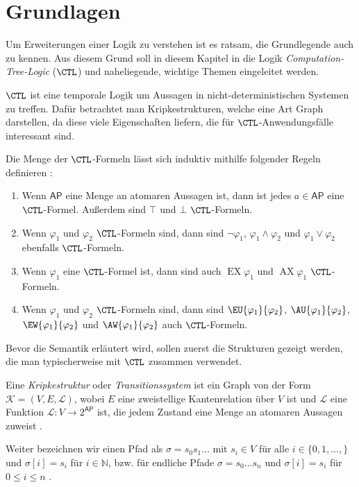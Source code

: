 \section{Grundlagen}
\label{ChapGrundlagen}

Um Erweiterungen einer Logik zu verstehen ist es ratsam, die Grundlegende auch zu kennen. Aus diesem Grund soll in diesem Kapitel in die Logik \textit{Computation-Tree-Logic} ($\CTL$) und naheliegende, wichtige Themen eingeleitet werden.

$\CTL$ ist eine temporale Logik um Aussagen in nicht-deterministischen Systemen zu treffen. 
Dafür betrachtet man Kripkestrukturen, welche eine Art Graph darstellen, da diese viele Eigenschaften liefern, die für $\CTL$-Anwendungsfälle interessant sind.

\begin{definition}
	Die Menge der $\CTL$-Formeln lässt sich induktiv mithilfe folgender Regeln definieren \cite{clarke1982design, baier2008principles}:
	\begin{enumerate}
		\item Wenn $\mathsf{AP}$ eine Menge an atomaren Aussagen ist, dann ist jedes $a\in \mathsf{AP}$ eine $\CTL$-Formel. Außerdem sind $\top$ und $\bot$ $\CTL$-Formeln.
		\item Wenn $\varphi_1$ und $\varphi_2$ $\CTL$-Formeln sind, dann sind $\neg\varphi_1$, $\varphi_1 \land \varphi_2$ und $\varphi_1 \lor \varphi_2$ ebenfalls $\CTL$-Formeln.
		\item Wenn $\varphi_1$ eine $\CTL$-Formel ist, dann sind auch $\operatorname{EX}\varphi_1$ und $\operatorname{AX}\varphi_1$ $\CTL$-Formeln.
		\item Wenn $\varphi_1$ und $\varphi_2$ $\CTL$-Formeln sind, dann sind $\EU{\varphi_1}{\varphi_2}$, $\AU{\varphi_1}{\varphi_2}$, $\EW{\varphi_1}{\varphi_2}$ und $\AW{\varphi_1}{\varphi_2}$ auch $\CTL$-Formeln.
	\end{enumerate}
\end{definition}

Bevor die Semantik erläutert wird, sollen zuerst die Strukturen gezeigt werden, die man typischerweise mit $\CTL$ zusammen verwendet.

\begin{definition}[Kripkestrukturen]
	\label{DefKripkeStruk}
	Eine \textit{Kripkestruktur} oder \textit{Transitionssystem} ist ein Graph von der Form $\mathcal{K}=(V, E, \mathcal{L})$, wobei $E$ eine zweistellige Kantenrelation über $V$ ist und $\mathcal{L}$ eine Funktion $\mathcal{L}:V\to2^{\mathsf{AP}}$ ist, die jedem Zustand eine Menge an atomaren Aussagen zuweist 	\cite{clarke1982design,clarke1986automatic}.
	
	Weiter bezeichnen wir einen Pfad als $\sigma=s_0 s_1 \dots$ mit $s_i\in V$ für alle $i\in\{0, 1,\dots,\}$ und $\sigma[i]=s_i$ für $i\in \mathbb{N}$, bzw. für endliche Pfade $\sigma = s_0 \dots s_n$ und $\sigma[i] = s_i$ für $0\leq i \leq n$ \cite{baier2008principles}.
\end{definition}

